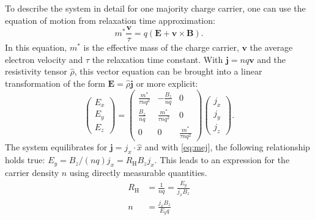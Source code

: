 To describe the system in detail for one majority charge carrier, one can use the 
equation of motion from relaxation time approximation:
\begin{equation}
	m^{*} \frac{\mathbf{v}}{\tau}=q(\mathbf{E}
	+\mathbf{v}\times \mathbf{B}).
\end{equation}
In this equation, $m^{*}$ is the effective mass of the charge carrier, $\mathbf{v}$ the
average electron velocity and $\tau$ the relaxation time constant.
With $\mathbf{j}=nq\mathbf{v}$ and the resistivity tensor $\hat{\rho}$, 
this vector equation can be brought into a linear transformation of the form
$\mathbf{E}=\hat{\rho}\mathbf{j}$ or more explicit:
\begin{equation}
	\label{eq:mej}
	\begin{pmatrix}
		E_{x} \\
		E_{y} \\
		E_{z}
	\end{pmatrix}
	=
	\begin{pmatrix}
		\frac{m^{*}}{\tau nq^{2}} & - \frac{B_{z}}{nq}        & 0                         \\
		\frac{B_{z}}{nq}          & \frac{m^{*}}{\tau nq^{2}} & 0                         \\
		0                         & 0                         & \frac{m^{*}}{\tau nq^{2}}
	\end{pmatrix}
	\begin{pmatrix}
		j_{x} \\
		j_{y} \\
		j_{z}
	\end{pmatrix}.
\end{equation}
The system equilibrates for $\mathbf{j} = j_x \cdot \hat{x}$ and with \cref{eq:mej}, the following
relationship holds true: $E_{y} = B_{z} / (nq) j_{x} = R_{\mathrm{H}}B_{z}j_{x}$.
This leads to an expression for the carrier density $n$ using directly measurable quantities.
\begin{align}
	R_{\mathrm{H}}&=\frac{1}{nq}=\frac{E_{y}}{j_{x}B_{z}}\\
	n&=\frac{j_{x}B_{z}}{E_{y}q}
\end{align}

